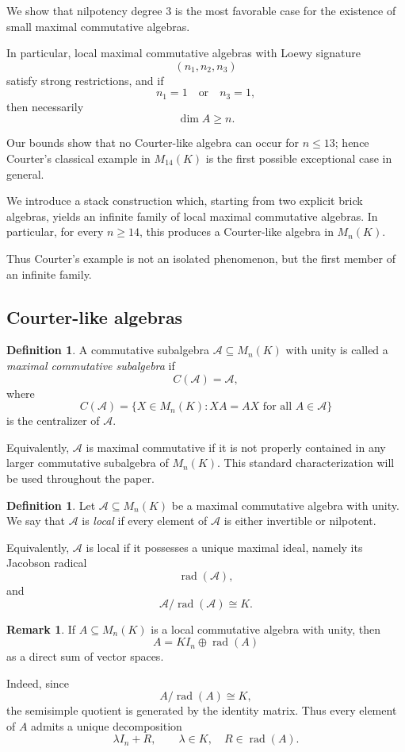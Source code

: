 \documentclass[11pt]{article}
\theoremstyle{remark}
\theoremstyle{plain}
\theoremstyle{definition}
\newtheorem{definition}[theorem]{Definition}
\theoremstyle{myremark}
\newtheorem{remark}{Remark}
\begin{document}
We show that nilpotency degree \(3\) is the most
favorable case for the existence of small maximal commutative algebras.

In particular, local maximal commutative algebras with Loewy signature
\[(n_1,n_2,n_3)\]
satisfy strong restrictions, and if
\[n_1=1\quad\text{or}\quad n_3=1,\]
then necessarily
\[\dim A\ge n.\]

Our bounds show that no Courter-like algebra can occur for \(n\le 13\);
hence Courter's classical example in \(M_{14}(K)\) is the first possible
exceptional case in general.

 We introduce a stack construction which, starting from two explicit brick algebras, yields an infinite family of local maximal commutative algebras. In particular, for every $n \ge 14$, this produces a Courter-like algebra in $M_n(K)$.

Thus Courter's example is not an isolated phenomenon, but the first
member of an infinite family.


\subsection*{Courter-like algebras}


\begin{definition}
	A commutative subalgebra
	$\mathcal A\subseteq M_n(K)$
	with unity is called a \emph{maximal commutative subalgebra} if
	\[	C(\mathcal A)=\mathcal A,	\]
	where
	\[	C(\mathcal A)=\{X\in M_n(K): XA=AX \text{ for all } A\in\mathcal A\}\]
	is the centralizer of $\mathcal A$.
\end{definition}

Equivalently, $\mathcal A$ is maximal commutative if it is not properly contained in any larger commutative subalgebra of $M_n(K)$. This standard characterization will be used throughout the paper.\medskip


\begin{definition}
	Let $\mathcal A\subseteq M_n(K)	$ 	be a maximal commutative algebra with unity.
	We say that \(\mathcal A\) is \emph{local} if every element of
	\(\mathcal A\) is either invertible or nilpotent.
	
	Equivalently, \(\mathcal A\) is local if it possesses a unique maximal
	ideal, namely its Jacobson radical
	\[	\operatorname{rad}(\mathcal A),	\]
	and
	\[	\mathcal A/\operatorname{rad}(\mathcal A)\cong K.
	\]\end{definition}

\begin{remark}
	If 	$A\subseteq M_n(K)$
	is a local commutative algebra with unity, then
	\[
	A=KI_n\oplus \operatorname{rad}(A)
	\]
	as a direct sum of vector spaces.
	
	Indeed, since
	\[
	A/\operatorname{rad}(A)\cong K,
	\]
	the semisimple quotient is generated by the identity matrix.
	Thus every element of \(A\) admits a unique decomposition
	\[
	\lambda I_n+R,	\qquad	\lambda\in K,	\quad	R\in\operatorname{rad}(A).
	\]
\end{remark}
\end{document}
